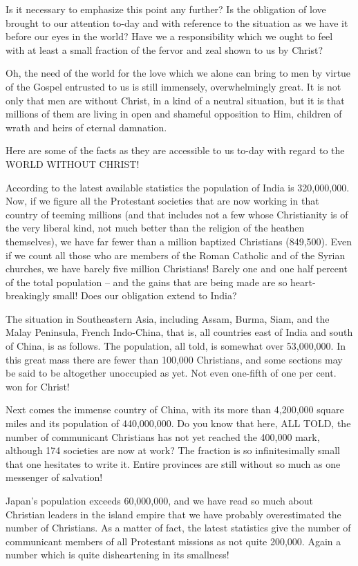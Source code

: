 \documentclass[
]{book}
\begin{document}
Is it necessary to emphasize this point any further? Is the obligation of love brought to our attention to-day and with reference to the situation as we have it before our eyes in the world? Have we a responsibility which we ought to feel with at least a small fraction of the fervor and zeal shown to us by Christ?

Oh, the need of the world for the love which we alone can bring to men by virtue of the Gospel entrusted to us is still immensely, overwhelmingly great. It is not only that men are without Christ, in a kind of a neutral situation, but it is that millions of them are living in open and shameful opposition to Him, children of wrath and heirs of eternal damnation.

Here are some of the facts as they are accessible to us to-day with regard to the WORLD WITHOUT CHRIST!

According to the latest available statistics the population of India is 320,000,000. Now, if we figure all the Protestant societies that are now working in that country of teeming millions (and that includes not a few whose Christianity is of the very liberal kind, not much better than the religion of the heathen themselves), we have far fewer than a million baptized Christians (849,500). Even if we count all those who are members of the Roman Catholic and of the Syrian churches, we have barely five million Christians! Barely one and one half percent of the total population -- and the gains that are being made are so heart-breakingly small! Does our obligation extend to India?

The situation in Southeastern Asia, including Assam, Burma, Siam, and the Malay Peninsula, French Indo-China, that is, all countries east of India and south of China, is as follows. The population, all told, is somewhat over 53,000,000. In this great mass there are fewer than 100,000 Christians, and some sections may be said to be altogether unoccupied as yet. Not even one-fifth of one per cent. won for Christ!

Next comes the immense country of China, with its more than 4,200,000 square miles and its population of 440,000,000. Do you know that here, ALL TOLD, the number of communicant Christians has not yet reached the 400,000 mark, although 174 societies are now at work? The fraction is so infinitesimally small that one hesitates to write it. Entire provinces are still without so much as one messenger of salvation!

Japan's population exceeds 60,000,000, and we have read so much about Christian leaders in the island empire that we have probably overestimated the number of Christians. As a matter of fact, the latest statistics give the number of communicant members of all Protestant missions as not quite 200,000. Again a number which is quite disheartening in its smallness!
\end{document}
